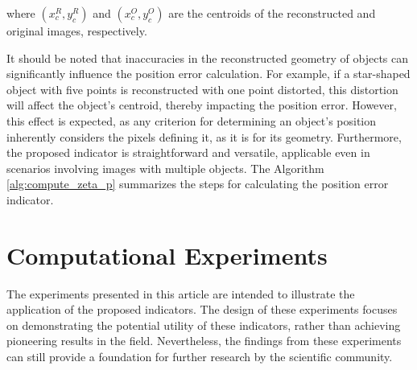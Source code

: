 \documentclass{IEEEtran}
\begin{document}
            \noindent where $(x_c^R, y_c^R)$ and $(x_c^O, y_c^O)$ are the centroids of the reconstructed and original images, respectively.


            It should be noted that inaccuracies in the reconstructed geometry of objects can significantly influence the position error calculation. For example, if a star-shaped object with five points is reconstructed with one point distorted, this distortion will affect the object's centroid, thereby impacting the position error. However, this effect is expected, as any criterion for determining an object's position inherently considers the pixels defining it, as it is for its geometry. Furthermore, the proposed indicator is straightforward and versatile, applicable even in scenarios involving images with multiple objects. The Algorithm \ref{alg:compute_zeta_p} summarizes the steps for calculating the position error indicator.

            
	
	\section{Computational Experiments}\label{sec:results}
	

        The experiments presented in this article are intended to illustrate the application of the proposed indicators. The design of these experiments focuses on demonstrating the potential utility of these indicators, rather than achieving pioneering results in the field. Nevertheless, the findings from these experiments can still provide a foundation for further research by the scientific community.
\end{document}
